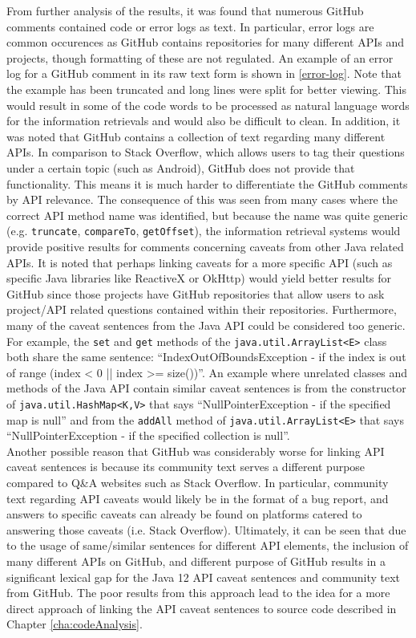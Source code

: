 From further analysis of the results, it was found that numerous GitHub comments contained code or error logs as text. In particular, error logs are common occurences as GitHub contains repositories for many different APIs and projects, though formatting of these are not regulated. An example of an error log for a GitHub comment in its raw text form is shown in \ref{error-log}. Note that the example has been truncated and long lines were split for better viewing. This would result in some of the code words to be processed as natural language words for the information retrievals and would also be difficult to clean. In addition, it was noted that GitHub contains a collection of text regarding many different APIs. In comparison to Stack Overflow, which allows users to tag their questions under a certain topic (such as Android), GitHub does not provide that functionality. This means it is much harder to differentiate the GitHub comments by API relevance. The consequence of this was seen from many cases where the correct API method name was identified, but because the name was quite generic (e.g. \lstinline{truncate}, \lstinline{compareTo}, \lstinline{getOffset}), the information retrieval systems would provide positive results for comments concerning caveats from other Java related APIs. It is noted that perhaps linking caveats for a more specific API (such as specific Java libraries like ReactiveX or OkHttp) would yield better results for GitHub since those projects have GitHub repositories that allow users to ask project/API related questions contained within their repositories. Furthermore, many of the caveat sentences from the Java API could be considered too generic. For example, the \lstinline{set} and \lstinline{get} methods of the \lstinline{java.util.ArrayList<E>} class both share the same sentence: ``IndexOutOfBoundsException - if the index is out of range (index < 0 || index >= size())''. An example where unrelated classes and methods of the Java API contain similar caveat sentences is from the constructor of \lstinline{java.util.HashMap<K,V>} that says ``NullPointerException - if the specified map is null'' and from the \lstinline{addAll} method of \lstinline{java.util.ArrayList<E>} that says ``NullPointerException - if the specified collection is null''. \\

Another possible reason that GitHub was considerably worse for linking API caveat sentences is because its community text serves a different purpose compared to Q\&A websites such as Stack Overflow. In particular, community text regarding API caveats would likely be in the format of a bug report, and answers to specific caveats can already be found on platforms catered to answering those caveats (i.e. Stack Overflow). Ultimately, it can be seen that due to the usage of same/similar sentences for different API elements, the inclusion of many different APIs on GitHub, and different purpose of GitHub results in a significant lexical gap for the Java 12 API caveat sentences and community text from GitHub. The poor results from this approach lead to the idea for a more direct approach of linking the API caveat sentences to source code described in Chapter \ref{cha:codeAnalysis}.

